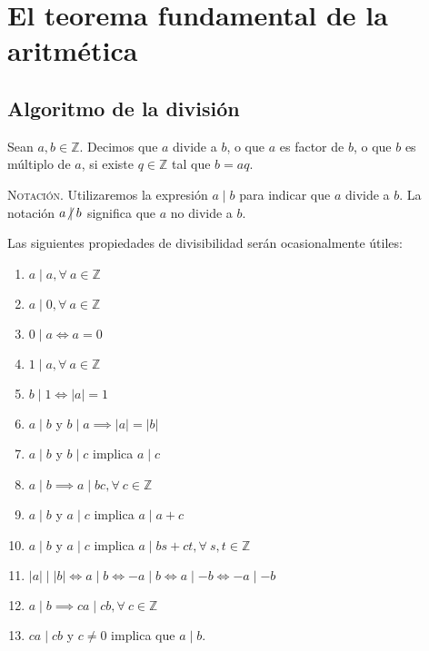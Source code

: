\newpage
{}
\section{El teorema fundamental de la aritmética}

\subsection{Algoritmo de la división}

\begin{definition}
Sean $a,b\in \mathbb{Z}$. Decimos que $a$ divide a $b$, o que $a$ es factor de $b$, o que $b$ es múltiplo de $a$, si existe $q\in \mathbb{Z}$ tal que $b=aq$.
\end{definition}
\textsc{Notación}. Utilizaremos la expresión $a\mid b$ para indicar que $a$ divide a $b$. La notación $a\centernot\mid b$ significa que $a$ no divide a $b$.

\begin{proposition}
\label{prop:prop1}Las siguientes propiedades de divisibilidad serán ocasionalmente útiles:

\begin{enumerate}[label=\textnormal{(\roman*)}]
	\item $a\mid a, \forall \: a\in \mathbb{Z}$
	\item $a\mid 0,\forall \: a\in \mathbb{Z}$
	\item $0\mid a\iff a=0$
	\item $1\mid a,\forall \: a\in \mathbb{Z}$
	\item $b\mid 1\iff |a|=1$
	\item $a\mid b$ y $b\mid a\implies |a|=|b|$
	\item $a\mid b$ y $b\mid c$ implica $a\mid c$
	\item $a\mid b \implies a\mid bc,\forall \: c\in \mathbb{Z}$
	\item $a\mid b$ y $a\mid c$ implica $a\mid a+c$
	\item $a\mid b$ y $a\mid c$ implica $a\mid bs+c t,\forall \: s,t\in \mathbb{Z}$
	\item $|a|\mid |b| \iff a\mid b \iff -a\mid b \iff a\mid -b \iff -a\mid -b$
	\item $a\mid b \implies ca \mid c b,\forall \: c\in \mathbb{Z}$
	\item $c a \mid c b$ y $c\neq 0$ implica que $a \mid b$.
\end{enumerate}
\end{proposition}

